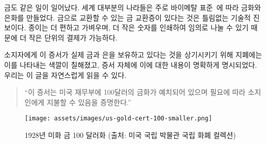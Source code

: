 \begin{comment}
	As mentioned above, the same thing happened to gold. Most of the world was on a
	bimetallic standard~\cite{wiki:bimetallism}, meaning coins were made
	primarily of gold and silver. Having certificates for gold, redeemable in gold
	coins, was arguably a technological improvement. Paper is more convenient,
	lighter, and since it can be divided arbitrarily by simply printing a smaller
	number on it, it is easier to break into smaller units.
\end{comment}
금도 같은 일이 일어났다. 
세계 대부분의 나라들은 주로 바이메탈 표준~\cite{wiki:bimetallism}에 따라 금화와 은화를 만들었다. 
금으로 교환할 수 있는 금 교환증이 있다는 것은 틀림없는 기술적 진보이다.
종이는 더 편하고 가벼우며, 더 작은 숫자를 인쇄하여 임의로 나눌 수 있기 때문에 더 작은 단위의 결제가
가능하다.

\begin{comment}
	To remind the bearers (users) that these certificates were
	representative for actual gold and silver, they were colored accordingly
	and stated this clearly on the certificate itself. You can fluently read
	the writing from top to bottom:
\end{comment}
소지자에게 이 증서가 실제 금과 은을 보유하고 있다는 것을 상기시키기 위해 지폐에는 이를 나타내는 색깔이
칠해졌고, 증서 자체에 이에 대한 내용이 명확하게 명시되었다. 
우리는 이 글을 자연스럽게 읽을 수 있다.

\begin{comment}
	\begin{quotation}\begin{samepage}
			\enquote{This certifies that there have been deposited in the treasury of the
				United States of America one hundred dollars in gold coin payable to
				the bearer on demand.}
	\end{samepage}\end{quotation}
\end{comment}
\begin{quotation}\begin{samepage}
		\enquote{이 증서는 미국 재무부에 100달러의 금화가 예치되어 있으며 필요에 따라 소지인에게 
			지불할 수 있음을 증명한다.}
\end{samepage}\end{quotation}

\begin{comment}
	\begin{figure}
		\centering
		\texttt{[image: assets/images/us-gold-cert-100-smaller.png]}
		\caption{A 1928 U.S. \$100 gold certificate. Picture cc-by-sa National Numismatic Collection, National Museum of American History.}
		\label{fig:us-gold-cert-100-smaller}
	\end{figure}
\end{comment}
\begin{figure}
	\centering
	\texttt{[image: assets/images/us-gold-cert-100-smaller.png]}
	\caption{1928년 미화 금 100 달러화 (출처: 미국 국립 박물관 국립 화폐 컬렉션)}
	\label{fig:us-gold-cert-100-smaller}
\end{figure}

